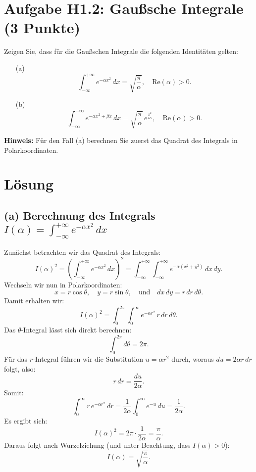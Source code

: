 \documentclass{article}
\begin{document}
\section*{Aufgabe H1.2: Gaußsche Integrale (3 Punkte)}

Zeigen Sie, dass für die Gaußschen Integrale die folgenden Identitäten gelten:
\begin{enumerate}
  \item[(a)]
    \[
    \int_{-\infty}^{+\infty} e^{-\alpha x^2}\,dx = \sqrt{\frac{\pi}{\alpha}}, \quad \text{Re}(\alpha) > 0.
    \]
  \item[(b)]
    \[
    \int_{-\infty}^{+\infty} e^{-\alpha x^2+\beta x}\,dx = \sqrt{\frac{\pi}{\alpha}}\, e^{\frac{\beta^2}{4\alpha}}, \quad \text{Re}(\alpha) > 0.
    \]
\end{enumerate}

\textbf{Hinweis:} Für den Fall (a) berechnen Sie zuerst das Quadrat des Integrals in Polarkoordinaten.

\bigskip

\section*{Lösung}

\subsection*{(a) Berechnung des Integrals \(\displaystyle I(\alpha)=\int_{-\infty}^{+\infty} e^{-\alpha x^2}\,dx\)}

Zunächst betrachten wir das Quadrat des Integrals:
\[
I(\alpha)^2 = \left( \int_{-\infty}^{+\infty} e^{-\alpha x^2}\,dx \right)^2 = \int_{-\infty}^{+\infty}\int_{-\infty}^{+\infty} e^{-\alpha(x^2+y^2)}\,dx\,dy.
\]
Wechseln wir nun in Polarkoordinaten:
\[
x = r\cos\theta,\quad y = r\sin\theta,\quad \text{und}\quad dx\,dy = r\,dr\,d\theta.
\]
Damit erhalten wir:
\[
I(\alpha)^2 = \int_0^{2\pi} \int_0^\infty e^{-\alpha r^2} \, r\,dr\, d\theta.
\]
Das \(\theta\)-Integral lässt sich direkt berechnen:
\[
\int_0^{2\pi} d\theta = 2\pi.
\]
Für das \(r\)-Integral führen wir die Substitution \(u=\alpha r^2\) durch, woraus \(du=2\alpha r\,dr\) folgt, also:
\[
r\,dr = \frac{du}{2\alpha}.
\]
Somit:
\[
\int_0^\infty r\, e^{-\alpha r^2}\,dr = \frac{1}{2\alpha} \int_0^\infty e^{-u}\,du = \frac{1}{2\alpha}.
\]
Es ergibt sich:
\[
I(\alpha)^2 = 2\pi \cdot \frac{1}{2\alpha} = \frac{\pi}{\alpha}.
\]
Daraus folgt nach Wurzelziehung (und unter Beachtung, dass \(I(\alpha)>0\)):
\[
I(\alpha) = \sqrt{\frac{\pi}{\alpha}}.
\]
\end{document}

